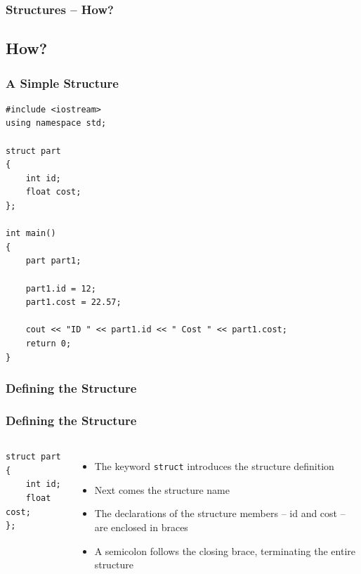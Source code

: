\documentclass{beamer}
\begin{document}
\begin{frame} [fragile]
    \frametitle{Structures -- How?}
    \subsection{How?} %
    \label{sub:how}
    \subsubsection{A Simple Structure} %
    \label{subsubsec:a_simple_structure}
    \lstset{style=mystyle}
    \begin{lstlisting}
#include <iostream>
using namespace std;

struct part
{
    int id;
    float cost;
};

int main()
{
    part part1;

    part1.id = 12;
    part1.cost = 22.57;

    cout << "ID " << part1.id << " Cost " << part1.cost;
    return 0;
}
\end{lstlisting}
\end{frame}

\begin{frame}[fragile]
    \frametitle{Defining the Structure}
    \subsubsection{Defining the Structure} %
    \label{ssub:defining_the_structure}
    \begin{columns}
        \lstset{style=mystyle}
\begin{lstlisting}
struct part
{
    int id;
    float cost;
};
\end{lstlisting}
            \begin{itemize}
            \item The keyword \texttt{struct} introduces the structure definition
            \item Next comes the structure name
            \item The declarations of the structure members -- id and cost -- are enclosed in braces
            \item A semicolon follows the closing brace, terminating the entire structure
            \end{itemize}
    \end{columns}
\end{frame}
\end{document}
